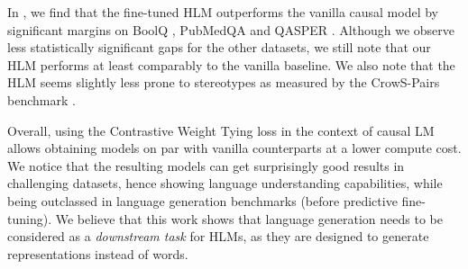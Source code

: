 \begin{table}
\centering
{}
\caption{Zero-shot evaluation of monolingual causal language models on datasets from the LM Evaluation Harness. We report the stereotype percentage for CrowS-Pairs and accuracy elsewhere. $^\dagger$: best scores that are significantly better than the second best score according to a one-tailed t-test with power 0.95.}
\label{tab:lm_zs_perf}
\end{table}

In , we find that the fine-tuned HLM outperforms the vanilla causal model by significant margins on BoolQ \citep{clark-etal-2019-boolq}, PubMedQA \citep{jin-etal-2019-pubmedqa} and QASPER \citep{dasigi-etal-2021-dataset}. Although we observe less statistically significant gaps for the other datasets, we still note that our HLM performs at least comparably to the vanilla baseline.
%
We also note that the HLM seems slightly less prone to stereotypes as measured by the CrowS-Pairs benchmark \citep{nangia-etal-2020-crows}.

Overall, using the Contrastive Weight Tying loss in the context of causal LM allows obtaining models on par with vanilla counterparts at a lower compute cost. We notice that the resulting models can get surprisingly good results in challenging datasets, hence showing language understanding capabilities, while being outclassed in language generation benchmarks (before predictive fine-tuning). We believe that this work shows that language generation needs to be considered as a \textit{downstream task} for HLMs, as they are designed to generate representations instead of words.

